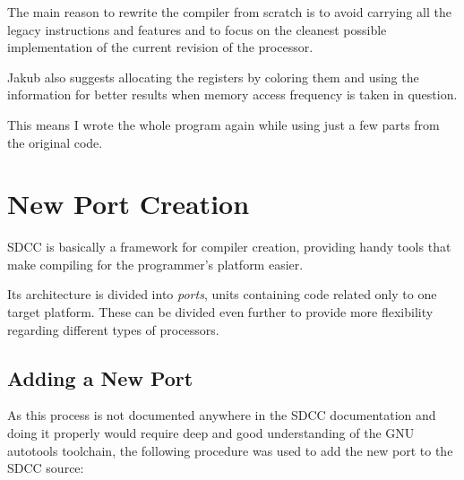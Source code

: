     The main reason to rewrite the compiler from scratch is to avoid carrying all the legacy instructions and features and to focus on the cleanest possible implementation of the current revision of the processor.

    Jakub also suggests allocating the registers by coloring them and using the information for better results when memory access frequency is taken in question.

    This means I wrote the whole program again while using just a few parts from the original code.


\chapter{New Port Creation}\label{port}

SDCC is basically a framework for compiler creation, providing handy tools that make compiling for the programmer's platform easier.

Its architecture is divided into \emph{ports}, units containing code related only to one target platform. These can be divided even further to provide more flexibility regarding different types of processors.

    \section{Adding a New Port}

    As this process is not documented anywhere in the SDCC documentation and doing it properly would require deep and good understanding of the GNU autotools toolchain, the following procedure was used to add the new port to the SDCC source:

